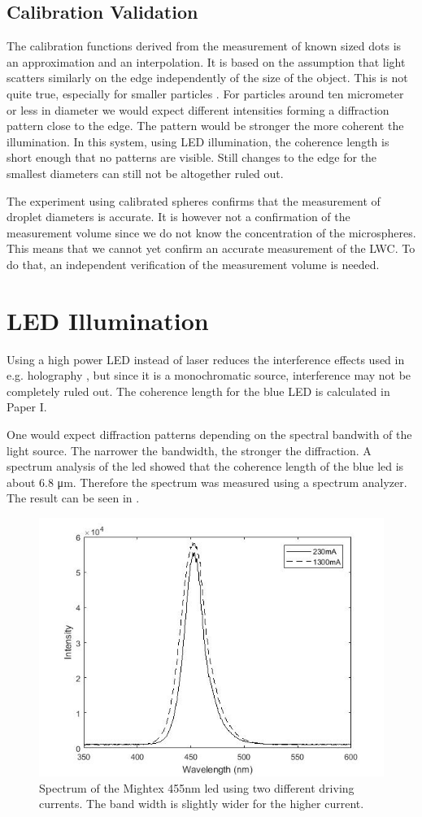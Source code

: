 \subsection{Calibration Validation}

The calibration functions derived from the measurement of known sized dots is an approximation and an interpolation. It is based on the assumption that light scatters similarly on the edge independently of the size of the object. This is not quite true, especially for smaller particles \cite{bohr2008}. For particles around ten micrometer or less in diameter we would expect different intensities forming a diffraction pattern close to the edge. The pattern would be stronger the more coherent the illumination. In this system, using LED illumination, the coherence length is short enough that no patterns are visible. Still changes to the edge for the smallest diameters can still not be altogether ruled out.

The experiment using calibrated spheres confirms that the measurement of droplet diameters is accurate. It is however not a confirmation of the measurement volume \cite{ryd2016} since we do not know the concentration of the microspheres. This means that we cannot yet confirm an accurate measurement of the LWC. To do that, an independent verification of the measurement volume is needed.


\section{LED Illumination}

Using a high power LED instead of laser reduces the interference effects used in e.g. holography \cite{henn2013}, but since it is a monochromatic source, interference may not be completely ruled out. The coherence length for the blue LED is calculated in Paper I.

One would expect diffraction patterns depending on the spectral bandwith of the light source. The narrower the bandwidth, the stronger the diffraction. A spectrum analysis of the \gls{led} showed that the coherence length of the blue \gls{led} is about 6.8 μm. Therefore the spectrum was measured using a spectrum analyzer. The result can be seen in .

\begin{figure}%
\centering\includegraphics[width=0.6\linewidth]{figures/spektralanalys_mightex455nm}
\caption{Spectrum of the Mightex 455nm \gls{led} using two different driving currents. The band width is slightly wider for the higher current.}
\label{fig:ledspectrum}
\end{figure}

